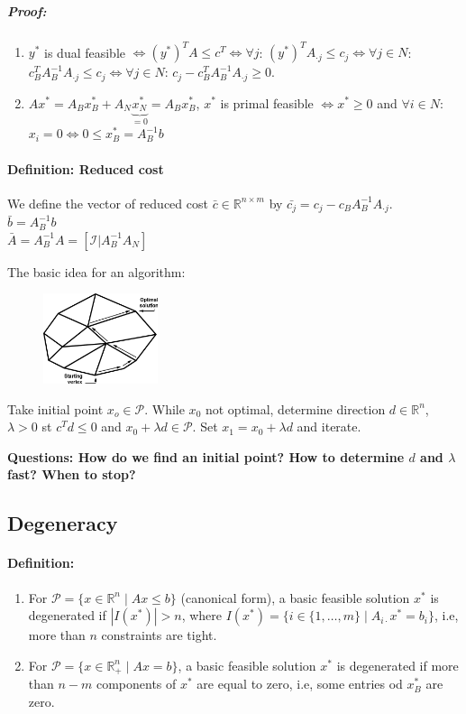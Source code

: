 \documentclass[main]{subfiles}
\begin{document}
\subparagraph{Proof:}
\begin{enumerate}
\item $y^*$ is dual feasible $\iff (y^*)^T A \leq c^T \iff \forall j$:
$(y^*)^T A_{\cdot j} \leq c_j \iff \forall j \in N$: $c^T_B A^{-1}_B
A_{\cdot j} \leq c_j \iff \forall j \in N$: $c_j - c^T_B A^{-1}_B A_{\cdot j}
\geq 0$.
\item $Ax^* = A_B x^*_B + A_N \underbrace{x^*_N}_{=0} = A_B x^*_B$,
$x^*$ is primal feasible $\iff x^* \geq 0$ and $\forall i \in N$:
$x_i = 0 \iff 0 \leq x^*_B = A^{-1}_B b$ 
\end{enumerate}

\paragraph{Definition: Reduced cost}
We define the vector of reduced cost $\bar{c} \in \mathbb{R}^{n \times m}$ by
$\bar{c_j} = c_j - c_B A^{-1}_B A_{\cdot j}$.\\
$\bar{b} = A^{-1}_B b$\\
$\bar{A} = A^{-1}_B A = [\mathcal{I} | A^{-1}_B A_N ]$

The basic idea for an algorithm:\\
\begin{figure}[!h]
  \label{fig:projection}
  \centering
    \includegraphics[width=0.3\textwidth]{imgs/simplex-description.png}
\end{figure}

Take initial point $x_o \in \mathcal{P}$. While $x_0$ not optimal, determine
direction $d \in \mathbb{R}^n$, $\lambda > 0$ st $c^T d \leq 0$ and
$x_0 + \lambda d \in \mathcal{P}$. Set $x_1 = x_0 + \lambda d$ and iterate.

\textbf{Questions: How do we find an initial point? How to determine $d$ and
$\lambda$ fast? When to stop?}

\subsection{Degeneracy}
\paragraph{Definition:}
\begin{enumerate}
\item For $\mathcal{P} = \{x \in \mathbb{R}^n \mid Ax \leq b\}$ (canonical
form), a basic feasible solution $x^*$ is degenerated if $|I(x^*)| > n$, where
$I(x^*) = \{i \in \{1, \dots, m\} \mid A_{i\cdot}x^* = b_i\}$, i.e, more than
$n$ constraints are tight.
\item For $\mathcal{P} = \{x \in \mathbb{R}^n_+ \mid Ax = b\}$, a basic
feasible solution $x^*$ is degenerated if more than $n-m$ components of $x^*$
are equal to zero, i.e, some entries od $x^*_B$ are zero.
\end{enumerate}
\end{document}
